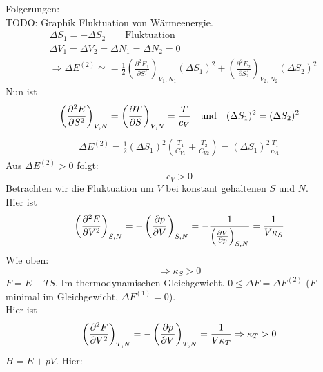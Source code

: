 Folgerungen: \\
TODO: Graphik Fluktuation von Wärmeenergie.\\  %
\begin{equation}
    \begin{split}
        & \Delta S_1 = - \Delta S_2 \qquad \text{Fluktuation} \\
        & \Delta V_1 = \Delta V_2 = \Delta N_1 = \Delta N_2 = 0 \\
        & \Rightarrow \Delta E^{(2)} \simeq = \frac{1}{2} \left( \frac{\partial^2 E_1}{\partial S_1^2} \right)_{V_1, N_1} (\Delta S_1)^2 +  
        \left( \frac{\partial^2 E_2}{\partial S_2^2} \right)_{V_2, N_2} (\Delta S_2)^2 
    \end{split}
\end{equation}
Nun ist
\begin{equation}
    \left( \frac{\partial^2 E}{\partial S^2} \right)_{V, N} = \left( \frac{\partial T}{\partial S} \right)_{V, N} = \frac{T}{c_V}  \quad \text{und} \quad
    (\Delta S_1)^2 = (\Delta S_2)^2
\end{equation}
\begin{equation}
    \begin{split}
        \Delta E^{(2)} = \frac{1}{2} (\Delta S_1)^2 \left( \frac{T_1}{C_{V1}} + \frac{T_2}{C_{V2}} \right) = (\Delta S_1)^2 \frac{T_1}{c_{V1}}
    \end{split}
\end{equation}
Aus $\Delta E^{(2)} > 0$ folgt:
\begin{equation}
    c_V > 0
\end{equation} 
Betrachten wir die Fluktuation um $V$ bei konstant gehaltenen $S$ und $N$. \\
Hier ist
\begin{equation}
    \left( \frac{\partial^2 E}{\partial V^2} \right)_{S, N} = - \left( \frac{\partial p}{\partial V} \right)_{S, N} = - \frac{1}{\left( \frac{\partial V}{\partial p} \right)_{S, N}} = \frac{1}{V \kappa_S}
\end{equation}
Wie oben:
\begin{equation}
    \Rightarrow \kappa_S > 0
\end{equation}
$F = E - TS$. Im thermodynamischen Gleichgewicht. $0 \leq \Delta F = \Delta F^{(2)}$ ($F$ minimal im Gleichgewicht, $\Delta F^{(1)} = 0$). \\
Hier ist
\begin{equation}
    \left( \frac{\partial^2 F}{\partial V^2} \right)_{T, N} = - \left( \frac{\partial p}{\partial V} \right)_{T, N} = \frac{1}{V \kappa_T} \Rightarrow \kappa_T > 0
\end{equation}
$H = E + pV$. Hier:
